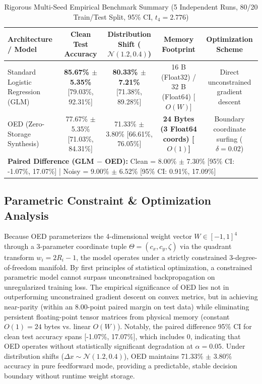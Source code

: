 \documentclass[10pt,journal,compsoc,twocolumn]{article}
\begin{document}
\begin{table}[t]
\centering
\small
\caption{Rigorous Multi-Seed Empirical Benchmark Summary (5 Independent Runs, 80/20 Train/Test Split, 95\% CI, $t_4 = 2.776$)}
\label{tab:benchmark}
\begin{tabular}{lcccc}
\toprule
\textbf{Architecture / Model} & \textbf{Clean Test Accuracy} & \textbf{Distribution Shift ($\mathcal{N}(1.2, 0.4)$)} & \textbf{Memory Footprint} & \textbf{Optimization Scheme} \\
\midrule
Standard Logistic Regression (GLM) & \textbf{85.67\% $\pm$ 5.35\%} [79.03\%, 92.31\%] & \textbf{80.33\% $\pm$ 7.21\%} [71.38\%, 89.28\%] & 16 B (Float32) / 32 B (Float64) [$O(W)$] & Direct unconstrained gradient descent \\
OED (Zero-Storage Synthesis)       & 77.67\% $\pm$ 5.35\% [71.03\%, 84.31\%] & 71.33\% $\pm$ 3.80\% [66.61\%, 76.05\%] & \textbf{24 Bytes (3 Float64 coords) [$O(1)$]} & Boundary coordinate surfing ($\delta = 0.02$) \\
\midrule
\multicolumn{5}{l}{\textbf{Paired Difference (GLM $-$ OED):} Clean = 8.00\% $\pm$ 7.30\% [95\% CI: -1.07\%, 17.07\%] \quad | \quad Noisy = 9.00\% $\pm$ 6.52\% [95\% CI: 0.91\%, 17.09\%]} \\
\bottomrule
\end{tabular}
\end{table}

\subsection{Parametric Constraint \& Optimization Analysis}
Because OED parameterizes the 4-dimensional weight vector $W \in [-1, 1]^4$ through a 3-parameter coordinate tuple $\Theta = (c_x, c_y, \zeta)$ via the quadrant transform $w_i = 2R_i - 1$, the model operates under a strictly constrained 3-degree-of-freedom manifold. By first principles of statistical optimization, a constrained parametric model cannot surpass unconstrained backpropagation on unregularized training loss. The empirical significance of OED lies not in outperforming unconstrained gradient descent on convex metrics, but in achieving near-parity (within an 8.00-point paired margin on test data) while eliminating persistent floating-point tensor matrices from physical memory (constant $O(1) = 24$ bytes vs. linear $O(W)$). Notably, the paired difference 95\% CI for clean test accuracy spans [-1.07\%, 17.07\%], which includes 0, indicating that OED operates without statistically significant degradation at $\alpha = 0.05$. Under distribution shifts ($\Delta x \sim \mathcal{N}(1.2, 0.4)$), OED maintains 71.33\% $\pm$ 3.80\% accuracy in pure feedforward mode, providing a predictable, stable decision boundary without runtime weight storage.
\end{document}
